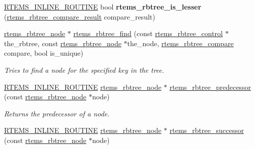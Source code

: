 \begin{DoxyCompactItemize}
\item 
\mbox{\label{group__ClassicRBTrees_ga08e4f616d5073da0a3355bd83d0c7d08}} 
\mbox{\hyperlink{group__RTEMSScoreBaseDefs_gac216239df231d5dbd15e3520b0b9313f}{R\+T\+E\+M\+S\+\_\+\+I\+N\+L\+I\+N\+E\+\_\+\+R\+O\+U\+T\+I\+NE}} bool {\bfseries rtems\+\_\+rbtree\+\_\+is\+\_\+lesser} (\mbox{\hyperlink{group__ClassicRBTrees_gaf0f8f451a211561514907b1dc47a6d9d}{rtems\+\_\+rbtree\+\_\+compare\+\_\+result}} compare\+\_\+result)
\item 
\mbox{\hyperlink{group__ClassicRBTrees_gaef47fc7fc61856c9afbf7f18a26ff80d}{rtems\+\_\+rbtree\+\_\+node}} $\ast$ \mbox{\hyperlink{group__ClassicRBTrees_ga103b60d647fc73bbdd4d24432236fc68}{rtems\+\_\+rbtree\+\_\+find}} (const \mbox{\hyperlink{group__ClassicRBTrees_ga21fe446d0b3cb8b25c814e93357753ef}{rtems\+\_\+rbtree\+\_\+control}} $\ast$the\+\_\+rbtree, const \mbox{\hyperlink{group__ClassicRBTrees_gaef47fc7fc61856c9afbf7f18a26ff80d}{rtems\+\_\+rbtree\+\_\+node}} $\ast$the\+\_\+node, \mbox{\hyperlink{group__ClassicRBTrees_gae5f1cdaef7551cbee5a877e65f442b93}{rtems\+\_\+rbtree\+\_\+compare}} compare, bool is\+\_\+unique)
\begin{DoxyCompactList}\small\item\em Tries to find a node for the specified key in the tree. \end{DoxyCompactList}\item 
\mbox{\hyperlink{group__RTEMSScoreBaseDefs_gac216239df231d5dbd15e3520b0b9313f}{R\+T\+E\+M\+S\+\_\+\+I\+N\+L\+I\+N\+E\+\_\+\+R\+O\+U\+T\+I\+NE}} \mbox{\hyperlink{group__ClassicRBTrees_gaef47fc7fc61856c9afbf7f18a26ff80d}{rtems\+\_\+rbtree\+\_\+node}} $\ast$ \mbox{\hyperlink{group__ClassicRBTrees_ga6f94273d178c81396125dd3e35b0584e}{rtems\+\_\+rbtree\+\_\+predecessor}} (const \mbox{\hyperlink{group__ClassicRBTrees_gaef47fc7fc61856c9afbf7f18a26ff80d}{rtems\+\_\+rbtree\+\_\+node}} $\ast$node)
\begin{DoxyCompactList}\small\item\em Returns the predecessor of a node. \end{DoxyCompactList}\item 
\mbox{\hyperlink{group__RTEMSScoreBaseDefs_gac216239df231d5dbd15e3520b0b9313f}{R\+T\+E\+M\+S\+\_\+\+I\+N\+L\+I\+N\+E\+\_\+\+R\+O\+U\+T\+I\+NE}} \mbox{\hyperlink{group__ClassicRBTrees_gaef47fc7fc61856c9afbf7f18a26ff80d}{rtems\+\_\+rbtree\+\_\+node}} $\ast$ \mbox{\hyperlink{group__ClassicRBTrees_gae3989932de3de54f73f6e99878d39825}{rtems\+\_\+rbtree\+\_\+successor}} (const \mbox{\hyperlink{group__ClassicRBTrees_gaef47fc7fc61856c9afbf7f18a26ff80d}{rtems\+\_\+rbtree\+\_\+node}} $\ast$node)

\end{DoxyCompactItemize}
